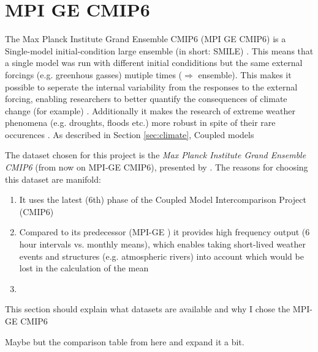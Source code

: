 \chapter{MPI GE CMIP6}
\label{ch:dataset}

The Max Planck Institute Grand Ensemble CMIP6 (MPI GE CMIP6) is a Single-model initial-condition large ensemble (in short: SMILE) \cite{olonscheck_new_2023}. 
This means that a single model was run with different initial condiditions but the same external forcings (e.g. greenhous gasses) mutiple times ($\Rightarrow$ ensemble). 
This makes it possible to seperate the internal variability from the responses to the external forcing, enabling researchers to better quantify the consequences of climate change (for example) . 
Additionally it makes the research of extreme weather phenomena (e.g. droughts, floods etc.) more robust in spite of their rare occurences \cite{maher_large_2021}. 
As described in Section \ref{sec:climate}, Coupled models 


The dataset chosen for this project is the \textit{Max Planck Institute Grand Ensemble CMIP6} (from now on MPI-GE CMIP6), presented by \citeauthor{olonscheck_new_2023} \cite{olonscheck_new_2023}. 
The reasons for choosing this dataset are manifold:

\begin{enumerate}
  \item It uses the latest (6th) phase of the Coupled Model Intercomparison Project (CMIP6)
  \item Compared to its predecessor (MPI-GE \cite{maher_max_2019}) it provides high frequency output (6 hour intervals vs. monthly means), which enables taking short-lived weather events and structures (e.g. atmospheric rivers) into account which would be lost in the calculation of the mean
  \item 
\end{enumerate}


This section should explain what datasets are available and why I chose the MPI-GE CMIP6 \cite{olonscheck_new_2023}

Maybe but the comparison table from \cite{olonscheck_new_2023} here and expand it a bit. 


